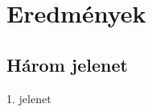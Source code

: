\section[Eredmények]{Eredmények}

\subsection{Három jelenet}

\begin{frame}{1. jelenet}

\centering

\begin{figure}


\end{figure}
\end{frame}
